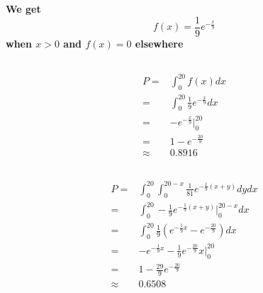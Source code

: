 \documentclass{article}
\begin{document}
    \section{}
        \paragraph{
            We get$$f(x)=\frac{1}{9}e^{-\frac{x}{9}}$$
            when $x>0$ and $f(x)=0$ elsewhere
        }
        \subsection{}
            \paragraph{
                \begin{equation*}
                    \begin{split}
                        P=&\int _0 ^{20} f(x)dx\\
                            =&\int _0 ^{20} \frac{1}{9}e^{-\frac{x}{9}}dx\\
                            =&-e^{-\frac{x}{9}}|_0^{20}\\
                            =&1-e^{-\frac{20}{9}}\\
                            \approx&0.8916
                    \end{split}
                \end{equation*}
            }
        \subsection{}
            \paragraph{
                \begin{equation*}
                    \begin{split}
                        P=&\int_0^{20}\int_{0}^{20-x}\frac{1}{81}e^{-\frac{1}{9}(x+y)}dydx\\
                            =&\int_0^{20}-\frac{1}{9}e^{-\frac{1}{9}(x+y)}|_0^{20-x}dx\\
                            =&\int_0^{20}\frac{1}{9}(e^{-\frac{1}{9}x}-e^{-\frac{20}{9}})dx\\
                            =&-e^{-\frac{1}{9}x}-\frac{1}{9}e^{-\frac{20}{9}}x|_0^{20}\\
                            =&1-\frac{29}{9}e^{-\frac{20}{9}}\\
                            \approx&0.6508
                    \end{split}
                \end{equation*}
            }
\end{document}
